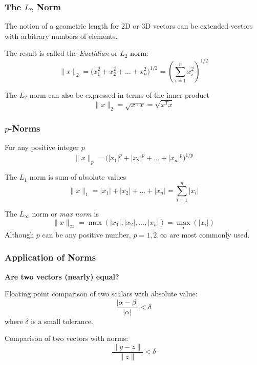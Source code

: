 \documentclass[10pt]{beamer}
\newcommand{\norm}[1]{{\ensuremath{{\|#1\|}}}}
\begin{document}
\begin{frame}
\frametitle{The $L_2$ Norm}

The notion of a geometric length for 2D or 3D vectors can be extended
vectors with arbitrary numbers of elements.

The result is called the \emph{Euclidian} or $L_2$ norm:
\begin{equation*}
    \|x\|_{2} = \bigl( x_1^2 + x_2^2 + \ldots + x_n^2 \bigr)^{1/2}
                 = \left( \sum_{i=1}^{n}{x_i^2} \right)^{1/2}
\end{equation*}

The $L_2$ norm can also be expressed in terms of the inner product
\begin{equation*}
    \|x\|_{2} = \sqrt{x \cdot x} = \sqrt{x^T x}
\end{equation*}

\end{frame}
\begin{frame}
\frametitle{$p$-Norms}

For any positive integer $p$
\begin{equation*}
    \|x\|_{p} = \bigl( |x_1|^p + |x_2|^p + \ldots + |x_n|^p \bigr)^{1/p}
\end{equation*}

The $L_1$ norm is sum of absolute values
\begin{equation*}
    \|x\|_{1} = |x_1| + |x_2| + \ldots + |x_n| = \sum_{i=1}^{n}{|x_i|}
\end{equation*}

The $L_\infty$ norm or \emph{max norm} is
\begin{equation*}
    \|x\|_{\infty} = \max \left(|x_1|, |x_2|, \ldots, |x_n| \right)
                      = \underset{i}{\max} \left( |x_i| \right)
\end{equation*}
Although $p$ can be any positive number, $p=1,2,\infty$ are most commonly used.

\end{frame}
\begin{frame}
\frametitle{Application of Norms}

\textbf{Are two vectors (nearly) equal?}\par
Floating point comparison of two scalars with absolute value:
\begin{equation*}
    \frac{\bigl| \alpha - \beta  \bigr|}{\bigl| \alpha \bigr|} < \delta
\end{equation*}
where $\delta$ is a small tolerance.

Comparison of two vectors with norms:
\begin{equation*}
    \frac{\norm{y-z}}{\norm{z}} < \delta
\end{equation*}

\end{frame}
\end{document}
